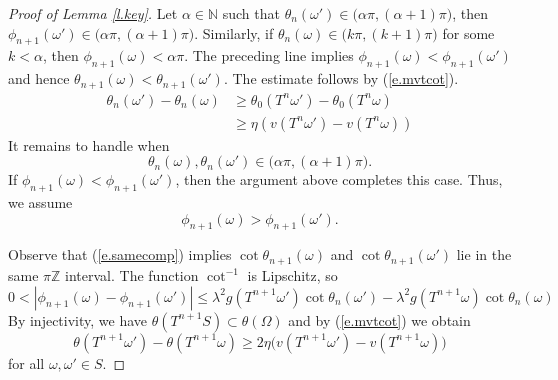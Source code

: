 \documentclass{amsart}
\newcommand{\NN}{\mathbb{N}}
\newcommand{\ZZ}{\mathbb{Z}}
\begin{document}
\begin{proof}[Proof of Lemma \ref{l.key}]
    Let $\alpha\in \NN$ such that $\theta_{n}(\omega')\in \Big(\alpha\pi, (\alpha+1)\pi \Big)$, then $\phi_{n+1}(\omega')\in \Big(\alpha\pi, (\alpha+1)\pi \Big)$. Similarly, if $\theta_{n}(\omega) \in \Big(k\pi, (k+1)\pi\Big)$ for some $k<\alpha$, then $\phi_{n+1}(\omega) < \alpha\pi$. The preceding line implies $\phi_{n+1}(\omega) < \phi_{n+1}(\omega')$ and hence $\theta_{n+1}(\omega) < \theta_{n+1}(\omega')$. The estimate follows by (\ref{e.mvtcot}).
    \begin{align*}
        \theta_{n}(\omega') - \theta_n(\omega)&\geq \theta_0(T^n\omega') - \theta_0(T^n\omega)\\
        &\geq \eta(v(T^n\omega') - v(T^n\omega))
    \end{align*}
    It remains to handle when
    \begin{equation}\label{e.samecomp}
        \theta_{n}(\omega), \theta_{n}(\omega')\in \Big(\alpha\pi, (\alpha+1)\pi \Big).
    \end{equation}
    If $\phi_{n+1}(\omega) < \phi_{n+1}(\omega')$, then the argument above completes this case. Thus, we assume
    \begin{equation}\label{e.xgreaty}
        \phi_{n+1}(\omega) > \phi_{n+1}(\omega').
    \end{equation}
    
    Observe that (\ref{e.samecomp}) implies $\cot\theta_{n+1}(\omega)$ and $\cot\theta_{n+1}(\omega')$ lie in the same $\pi \ZZ$ interval. The function $\cot^{-1}$ is Lipschitz, so
    \[0 < |\phi_{n+1}(\omega) - \phi_{n+1}(\omega')| \leq \lambda^2g(T^{n+1}\omega')\cot\theta_{n}(\omega') - \lambda^2g(T^{n+1}\omega)\cot\theta_{n}(\omega)\]
    By injectivity, we have $\theta(T^{n+1}S) \subset \theta(\Omega)$ and by (\ref{e.mvtcot}) we obtain
    \[\theta(T^{n+1}\omega') - \theta(T^{n+1}\omega)\geq 2\eta\Big(v(T^{n+1}\omega') - v(T^{n+1}\omega)\Big)\]
    for all $\omega,\omega'\in S$.


\end{proof}
\end{document}
